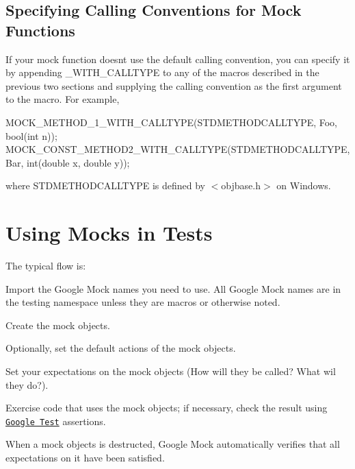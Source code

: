 \subsection*{Specifying Calling Conventions for Mock Functions}

If your mock function doesn\textquotesingle{}t use the default calling convention, you can specify it by appending {\ttfamily \+\_\+\+W\+I\+T\+H\+\_\+\+C\+A\+L\+L\+T\+Y\+PE} to any of the macros described in the previous two sections and supplying the calling convention as the first argument to the macro. For example, 
\begin{DoxyCode}
MOCK\_METHOD\_1\_WITH\_CALLTYPE(STDMETHODCALLTYPE, Foo, bool(int n));
MOCK\_CONST\_METHOD2\_WITH\_CALLTYPE(STDMETHODCALLTYPE, Bar, int(double x, double y));
\end{DoxyCode}
 where {\ttfamily S\+T\+D\+M\+E\+T\+H\+O\+D\+C\+A\+L\+L\+T\+Y\+PE} is defined by {\ttfamily $<$objbase.\+h$>$} on Windows.

\section*{Using Mocks in Tests}

The typical flow is\+:
\begin{DoxyEnumerate}
\item Import the Google Mock names you need to use. All Google Mock names are in the {\ttfamily testing} namespace unless they are macros or otherwise noted.
\end{DoxyEnumerate}
\begin{DoxyEnumerate}
\item Create the mock objects.
\end{DoxyEnumerate}
\begin{DoxyEnumerate}
\item Optionally, set the default actions of the mock objects.
\end{DoxyEnumerate}
\begin{DoxyEnumerate}
\item Set your expectations on the mock objects (How will they be called? What wil they do?).
\end{DoxyEnumerate}
\begin{DoxyEnumerate}
\item Exercise code that uses the mock objects; if necessary, check the result using \href{../../googletest/}{\tt Google Test} assertions.
\end{DoxyEnumerate}
\begin{DoxyEnumerate}
\item When a mock objects is destructed, Google Mock automatically verifies that all expectations on it have been satisfied.
\end{DoxyEnumerate}

